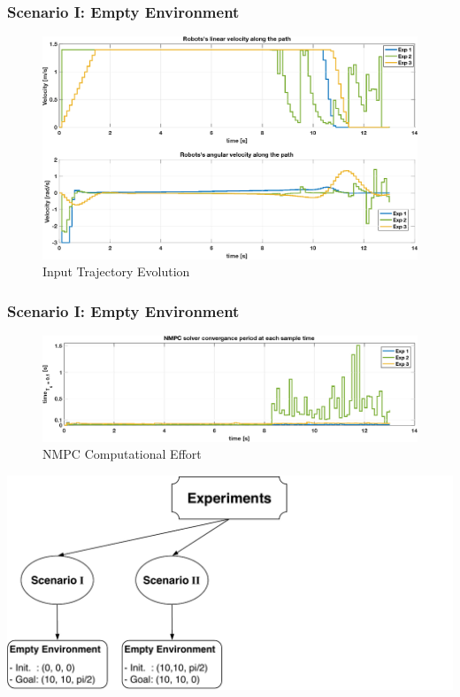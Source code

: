 	\begin{frame}
		\frametitle{Scenario \textrm{I}: Empty Environment}
		\begin{figure}[hbtp]
			\centering
			\includegraphics[scale=0.42]{pictures/graphs/sn1_inputs.eps}
			\caption{Input Trajectory Evolution}
		\end{figure}
	\end{frame}

	\begin{frame}
		\frametitle{Scenario \textrm{I}: Empty Environment}
		\begin{figure}[hbtp]
			\centering
			\includegraphics[scale=0.42]{pictures/graphs/sn1_solver_time.eps}
			\caption{NMPC Computational Effort}
		\end{figure}
	\end{frame}
 
	\begin{frame}
		\centering
		\includegraphics[scale=0.7]{pictures/eperiments_2.pdf}
	\end{frame}
 
